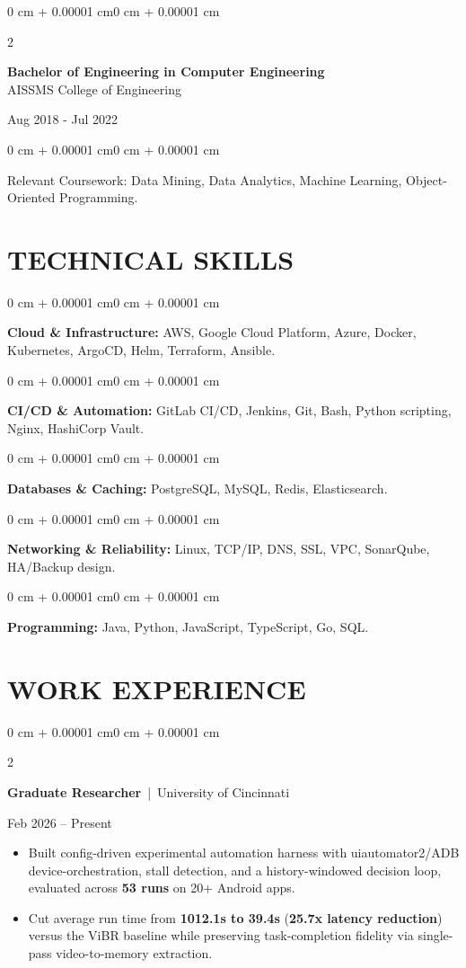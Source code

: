 \documentclass[10pt, letterpaper]{article}
\newenvironment{highlights}{
    \begin{itemize}[
        topsep=0.10 cm,
        parsep=0.06 cm,
        partopsep=0pt,
        itemsep=0.06 cm,
        leftmargin=12pt
    ]
}{
    \end{itemize}
}
\newenvironment{onecolentry}{
    \begin{adjustwidth}{0 cm + 0.00001 cm}{0 cm + 0.00001 cm}
}{
    \end{adjustwidth}
}
\newenvironment{twocolentry}[2][]{
    \onecolentry
    \def\secondColumn{#2}
    \setcolumnwidth{\fill, 4.5 cm}
    \begin{paracol}{2}
}{
    \switchcolumn \raggedleft \secondColumn
    \end{paracol}
    \endonecolentry
}
\begin{document}
\begin{twocolentry}{
    Aug 2018 - Jul 2022
}
    \textbf{Bachelor of Engineering in Computer Engineering} \\
    AISSMS College of Engineering
\end{twocolentry}
\begin{onecolentry}
Relevant Coursework: Data Mining, Data Analytics, Machine Learning, Object-Oriented Programming.
\end{onecolentry}
\section{TECHNICAL SKILLS}
\begin{onecolentry}
\textbf{Cloud \& Infrastructure:} AWS, Google Cloud Platform, Azure, Docker, Kubernetes, ArgoCD, Helm, Terraform, Ansible.
\end{onecolentry}
\vspace{0.06 cm}
\begin{onecolentry}
\textbf{CI/CD \& Automation:} GitLab CI/CD, Jenkins, Git, Bash, Python scripting, Nginx, HashiCorp Vault.
\end{onecolentry}
\vspace{0.06 cm}
\begin{onecolentry}
\textbf{Databases \& Caching:} PostgreSQL, MySQL, Redis, Elasticsearch.
\end{onecolentry}
\vspace{0.06 cm}
\begin{onecolentry}
\textbf{Networking \& Reliability:} Linux, TCP/IP, DNS, SSL, VPC, SonarQube, HA/Backup design.
\end{onecolentry}
\vspace{0.06 cm}
\begin{onecolentry}
\textbf{Programming:} Java, Python, JavaScript, TypeScript, Go, SQL.
\end{onecolentry}

\section{WORK EXPERIENCE}
\begin{twocolentry}{Feb 2026 -- Present}
\textbf{Graduate Researcher} \,|\, University of Cincinnati
\end{twocolentry}
\begin{highlights}
  \item Built config-driven experimental automation harness with uiautomator2/ADB device-orchestration, stall detection, and a history-windowed decision loop, evaluated across \textbf{53 runs} on 20+ Android apps.
  \item Cut average run time from \textbf{1012.1s to 39.4s} (\textbf{25.7x latency reduction}) versus the ViBR baseline while preserving task-completion fidelity via single-pass video-to-memory extraction.
\end{highlights}
\end{document}
